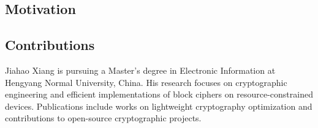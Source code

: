 \documentclass[journal]{IEEEtran}
\begin{document}
\subsection{Motivation}

\subsection{Contributions}









\begin{IEEEbiography}{Jiahao Xiang}
  is pursuing a Master's degree in Electronic Information at Hengyang Normal University, China. His research focuses on cryptographic engineering and efficient implementations of block ciphers on resource-constrained devices. Publications include works on lightweight cryptography optimization and contributions to open-source cryptographic projects.
\end{IEEEbiography}
\end{document}
